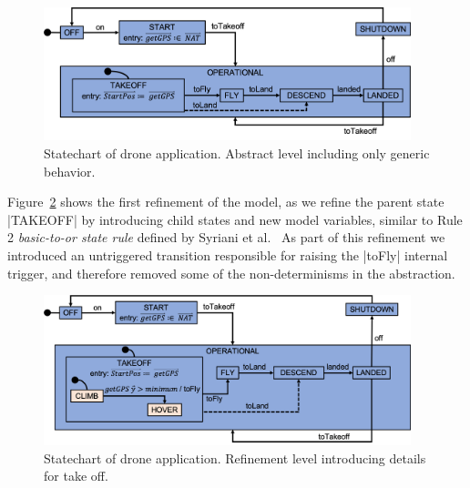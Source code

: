 \begin{figure}[!h]
	\vspace{-.4cm}
	\centering
	\includegraphics[width=0.95\textwidth]{figures/Picture1.png}
	\caption{Statechart of drone application. Abstract level including only generic behavior. }
	\label{fig:drone1}
	\vspace{-.4cm}
\end{figure} 

Figure~\ref{fig:drone2} shows the first refinement of the model, as we refine the parent state |TAKEOFF|
by introducing child states and new model variables, similar to 
Rule 2 \emph{basic-to-or state rule} defined by Syriani et al.~\cite{Syriani_2019}
As part of this refinement we introduced an untriggered transition responsible for 
raising the |toFly| internal trigger, and therefore removed some of the non-determinisms in the abstraction.

\begin{figure}[!h]
	\centering
	\includegraphics[width=0.95\textwidth]{figures/Picture2.png}
	\caption{Statechart of drone application. Refinement level introducing details for take off.}
	\label{fig:drone2}
\end{figure} 

